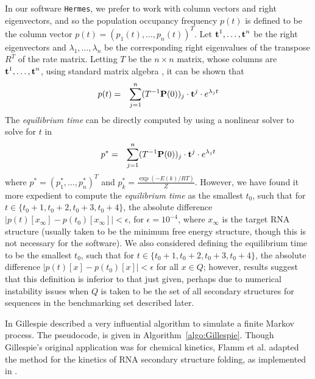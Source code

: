 In our software {\tt Hermes}, we prefer to work with column vectors and
right eigenvectors, and so the population occupancy frequency
$p(t)$ is defined to be the column vector
$p(t)=(p_1(t),\ldots,p_n(t))^T$. Let
$\mbox{\bf t}^1,\ldots,\mbox{\bf t}^n$ be the right eigenvectors and
$\lambda_1,\ldots,\lambda_n$ be the corresponding right eigenvalues of the
transpose $R^T$ of the rate matrix.
Letting $T$ be the $n\times n$ matrix, whose columns are
$\mbox{\bf t}^1,\ldots,\mbox{\bf t}^n$, using standard matrix algebra
\cite{matrixTheory}, it can be shown that
\begin{eqnarray}
\label{eq:solutionMasterEquation}
p(t) &=& \sum_{j=1}^n (T^{-1}
\mbox{\bf P}(0))_j \cdot \mbox{\bf t}^j \cdot e^{\lambda_j t}
\end{eqnarray}
The {\em equilibrium time} can be directly computed by using a
nonlinear solver to solve for $t$ in
\begin{eqnarray}
\label{eq:solutionEquilibriumTime}
p^* &=& \sum_{j=1}^n (T^{-1}
\mbox{\bf P}(0))_j \cdot \mbox{\bf t}^j \cdot e^{\lambda_j t}
\end{eqnarray}
where $p^*= (p^*_1,\ldots,p^*_n)^T$ and $p^*_k = \frac{\exp(-E(k)/RT)}{Z}$.
However, we have found it more
expedient to compute the {\em equilibrium time} as the smallest $t_0$,
such that for $t \in \{t_0+1,t_0+2,t_0+3,t_0+4\}$, the absolute difference
$|p(t)[x_{\infty}] - p(t_0)[x_{\infty}]| < \epsilon$, for $\epsilon =
10^{-4}$, where $x_{\infty}$ is the target RNA structure (usually taken
to be the minimum free energy structure, though this is not necessary for
the software). We also considered defining the equilibrium time to be the
smallest $t_0$, such that for $t \in \{t_0+1,t_0+2,t_0+3,t_0+4\}$, the
absolute difference $|p(t)[x] - p(t_0)[x]| < \epsilon$ for all $x \in
Q$; however, results suggest that this definition is inferior
to that just given, perhaps due to numerical instability issues when
$Q$ is taken to be the set of all secondary structures for sequences in
the benchmarking set described later.


In \cite{gillespieStochasticSimulation1} Gillespie described
a very influential algorithm to simulate a finite Markov process.
The pseudocode, is given in Algorithm~\ref{algo:Gillespie}.
Though Gillespie's original application was for chemical kinetics,
Flamm et al.  adapted the method for the kinetics of RNA secondary structure
folding, as implemented in \kinfold \cite{flammPhD,flamm}.


